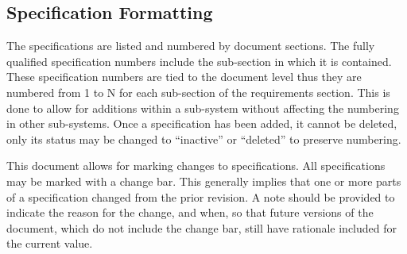\subsection{Specification Formatting}
\label{ssec:Intro_SpecFormatting}

The specifications are listed and numbered by document sections. 
The fully qualified specification numbers include the sub-section in which it is contained. 
These specification numbers are tied to the document level thus they are numbered from 1 to N for each sub-section of the requirements section. 
This is done to allow for additions within a sub-system without affecting the numbering in other sub-systems. 
Once a specification has been added, it cannot be deleted, only its status may be changed to ``inactive'' or ``deleted'' to preserve numbering.

This document allows for marking changes to specifications.
All specifications may be marked with a change bar.
This generally implies that one or more parts of a specification changed from the prior revision.
A note should be provided to indicate the reason for the change, and when, so that future versions of the document, which do not include the change bar, still have rationale included for the current value.


